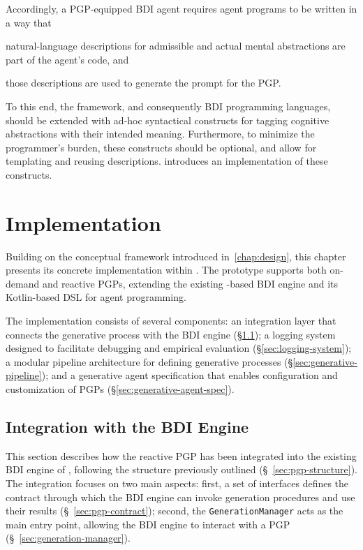 \documentclass[12pt,a4paper,openright,twoside]{book}
\begin{document}
Accordingly, a \ac{PGP}-equipped \ac{BDI} agent requires agent programs to be written in a way that
\begin{inlinelist}
    \item natural-language descriptions for admissible and actual mental abstractions are part of the agent's code, and
    \item those descriptions are used to generate the prompt for the \ac{PGP}.
\end{inlinelist}
%
To this end, the \agentspeak{} framework, and consequently \ac{BDI} programming languages, should be extended with ad-hoc syntactical constructs for tagging cognitive abstractions with their intended meaning.
%
Furthermore, to minimize the programmer's burden, these constructs should be optional, and allow for templating and reusing descriptions.
%
 introduces an implementation of these constructs.

\chapter{Implementation}\label{chap:implementation}

Building on the conceptual framework introduced in~\cref{chap:design}, this chapter presents its concrete implementation within \jakta{}.
%
The prototype supports both on-demand and reactive \acp{PGP}, extending the existing \agentspeak{}-based \ac{BDI} engine and its Kotlin-based \ac{DSL} for agent programming.

The implementation consists of several components: 
%
an integration layer that connects the generative process with the \ac{BDI} engine (§\ref{sec:bdi-integration}); 
%
a logging system designed to facilitate debugging and empirical evaluation (§\ref{sec:logging-system}); 
%
a modular pipeline architecture for defining generative processes (§\ref{sec:generative-pipeline}); 
%
and a generative agent specification that enables configuration and customization of \acp{PGP} (§\ref{sec:generative-agent-spec}).

\section{Integration with the BDI Engine}\label{sec:bdi-integration}

This section describes how the reactive \ac{PGP} has been integrated into the existing \ac{BDI} engine of \jakta{}, following the structure previously outlined (\S~\ref{sec:pgp-structure}).
%
The integration focuses on two main aspects:
%
first, a set of interfaces defines the contract through which the \ac{BDI} engine can invoke generation procedures and use their results (\S~\ref{sec:pgp-contract});
%
second, the \texttt{GenerationManager} acts as the main entry point, allowing the \ac{BDI} engine to interact with a \ac{PGP} (\S~\ref{sec:generation-manager}).
\end{document}
